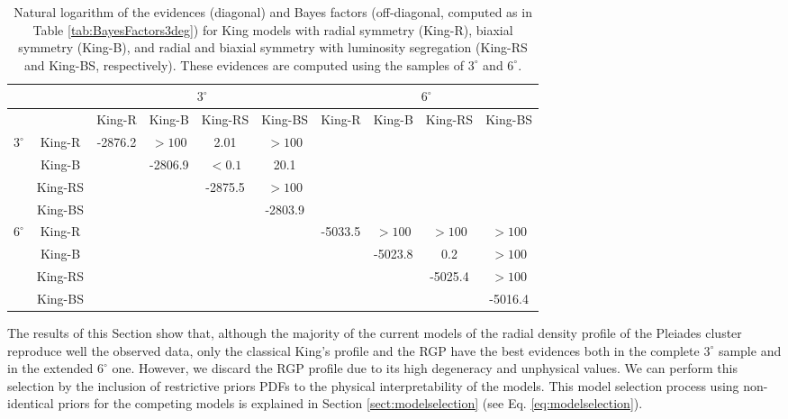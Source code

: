 \begin{table}[H]
  \centering
  \caption[]{Natural logarithm of the evidences (diagonal) and Bayes factors (off-diagonal, computed as in Table \ref{tab:BayesFactors3deg}) for King models with radial symmetry (King-R), biaxial symmetry (King-B), and radial and biaxial symmetry with luminosity segregation (King-RS and King-BS, respectively). These evidences are computed using the samples of $3^{\circ}$ and $6^{\circ}$.}
  {\small 
\begin{tabular}{cc|cccc|cccc}
\hline              
\hline              
&&  \multicolumn{4}{c}{$3^{\circ}$} &   \multicolumn{4}{c}{$6^{\circ}$} \\
\hline              
&&King-R& King-B &  King-RS& King-BS & King-R & King-B& King-RS &  King-BS \\
\hline              
\multirow{4}{*}{$3^{\circ}$} &King-R&-2876.2&$>100$&2.01&$>100$&&&&\\
&King-B&&-2806.9&$<0.1$&20.1&&&&\\
&King-RS    & & &-2875.5   & $>100$&          &           &    &        \\
 &King-BS &    &   &     &  -2803.9  &   &&        &           \\
 \hline
\multirow{4}{*}{$6^{\circ}$}&King-R   && &&            & -5033.5          & $>100$  & $>100$&  $>100$  \\
&King-B&&&&&&-5023.8&0.2& $>100$\\
&King-RS &&&&            &           &         & -5025.4  &   $>100$  \\
&King-BS &&&&            &           &         &  &  -5016.4   \\
\hline              
         \end{tabular}
         }
\label{tab:BayesFactorsAll}
\end{table}

The results of this Section show that, although the majority of the current models of the radial density profile of the Pleiades cluster reproduce well the observed data, only the classical King's profile and the RGP have the best evidences both in the complete $3^\circ$ sample and in the extended $6^\circ$ one. However, we discard the RGP profile due to its high degeneracy and unphysical values. We can perform this selection by the inclusion of restrictive priors PDFs to the physical interpretability of the models. This model selection process using non-identical priors for the competing models is explained in Section \ref{sect:modelselection} (see Eq. \ref{eq:modelselection}). 

